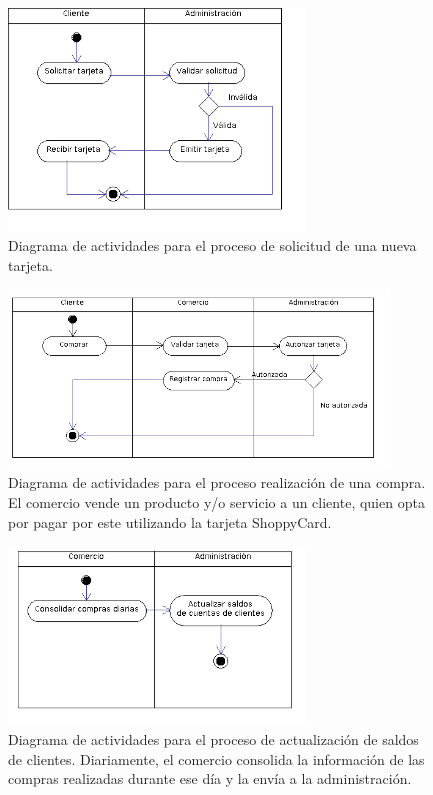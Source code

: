 \begin{figure}[htb]
\begin{center}
\includegraphics[width=0.7\textwidth]{images/mod_negocio_act_solicitudtarjeta.png}
\end{center}
\caption{Diagrama de actividades para el proceso de solicitud de una nueva
tarjeta.}
\end{figure}

\begin{figure}[htb]
\begin{center}
\includegraphics[width=0.9\textwidth]{images/mod_negocio_act_compra.png}
\end{center}
\caption{Diagrama de actividades para el proceso realización de una compra. El
comercio vende un producto y/o servicio a un cliente, quien opta por pagar por
este utilizando la tarjeta ShoppyCard.}
\end{figure}

\begin{figure}[htb]
\begin{center}
\includegraphics[width=0.7\textwidth]{images/mod_negocio_act_regcompras.png}
\end{center}
\caption{Diagrama de actividades para el proceso de actualización de saldos de
clientes. Diariamente, el comercio consolida la información de las compras
realizadas durante ese día y la envía a la administración.}
\end{figure}

